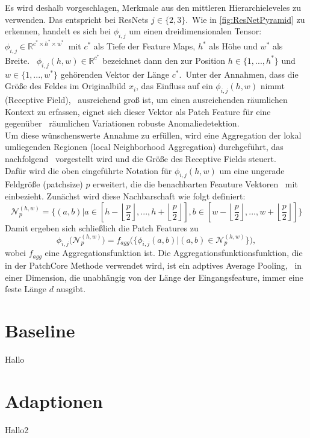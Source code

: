 Es wird deshalb vorgeschlagen, Merkmale aus den mittleren Hierarchieleveles zu verwenden. Das entspricht bei ResNets $j\in \{2,3\}$.\
Wie in \ref{fig:ResNetPyramid} zu erkennen, handelt es sich bei $\phi_{i,j}$ um einen dreidimensionalen Tensor: $\phi_{i,j}\in \mathbb{R}^{c^{*}\times h^{*}\times w^{*}}$\
mit $c^{*}$ als Tiefe der Feature Maps, $h^{*}$ als Höhe und $w^{*}$ als Breite. \
$\phi_{i,j}(h,w)\in\mathbb{R}^{c^{*}}$ bezeichnet dann den zur Position $h\in\{1,...,h^{*}\}$ und $w\in\{1,...,w^{*}\}$ gehörenden Vektor der Länge $c^{*}$.\
Unter der Annahmen, dass die Größe des Feldes im Originalbild $x_{i}$, das Einfluss auf ein $\phi_{i,j}(h,w)$ nimmt (\glqq Receptive Field\grqq{}), \
ausreichend groß ist, um einen ausreichenden räumlichen Kontext zu erfassen, eignet sich dieser Vektor als \glqq Patch Feature\grqq{} für eine gegenüber \ 
räumlichen Variationen robuste Anomaliedetektion.\\
Um diese wünschenswerte Annahme zu erfüllen, wird eine Aggregation der lokal umliegenden Regionen (\glqq local Neighborhood Aggregation\grqq{}) durchgeführt, das nachfolgend \
vorgestellt wird und die Größe des Receptive Fields steuert.\\
Dafür wird die oben eingeführte Notation für $\phi_{i,j}(h,w)$ um eine ungerade Feldgröße (\glqq patchsize\grqq{}) $p$ erweitert, die die benachbarten Feauture Vektoren \
mit einbezieht. Zunächst wird diese Nachbarschaft wie folgt definiert:\
$$
\mathcal{N}_{p}^{(h,w)} = \{(a,b)| a \in [h-\left\lfloor \frac{p}{2}\right\rfloor,...,h+\left\lfloor \frac{p}{2} \right\rfloor], b \in [w-\left\lfloor \frac{p}{2}\right\rfloor,...,w+\left\lfloor \frac{p}{2}\right\rfloor]\}
$$ 
Damit ergeben sich schließlich die \glqq Patch Features\grqq{} zu\
$$
\phi_{i,j}\Big(\mathcal{N}_{p}^{(h,w)}\Big) = f_{agg}\Big(\{\phi_{i,j}(a,b)| (a,b) \in \mathcal{N}_{p}^{(h,w)}\}\Big),
$$
wobei $f_{agg}$ eine Aggregationsfunktion ist. Die Aggregationsfunktionsfunktion, die in der PatchCore Methode verwendet wird, ist ein adptives \glqq Average Pooling\grqq{}, \
in einer Dimension, die unabhängig von der Länge der Eingangsfeature, immer eine feste Länge $d$ ausgibt.\

\section{Baseline}
\label{sec:Baseline}
Hallo

\section{Adaptionen}
\label{sec:Adaptionen}
Hallo2